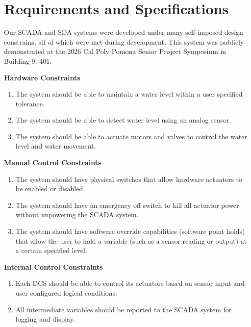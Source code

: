 \documentclass[../main.tex]{subfiles}
\begin{document}
\section{Requirements and Specifications}
\label{sec:req_and_spec}

Our SCADA and SDA systems were developed under many self-imposed design constrains, all of which were met during development. This system was publicly demonstrated at the 2026 Cal Poly Pomona Senior Project Symposium in Building 9, 401. 

\noindent\textbf{Hardware Constraints}
\begin{enumerate}[label=\arabic*.]

\item The system should be able to maintain a water level within a user specified tolerance.
\item The system should be able to detect water level using an analog sensor.
\item The system should be able to actuate motors and valves to control the water level and water movement.

\end{enumerate}

\noindent\textbf{Manual Control Constraints}
\begin{enumerate}[label=\arabic*.]

\item The system should have physical switches that allow hardware actuators to be enabled or disabled.
\item The system should have an emergency off switch to kill all actuator power without unpowering the SCADA system.
\item The system should have software override capabilities (software point holds) that allow the user to hold a variable (such as a sensor reading or output) at a certain specified level.

\end{enumerate}

\noindent\textbf{Internal Control Constraints}
\begin{enumerate}[label=\arabic*.]

\item Each DCS should be able to control its actuators based on sensor input and user configured logical conditions.
\item All intermediate variables should be reported to the SCADA system for logging and display.


\end{enumerate}
\end{document}
